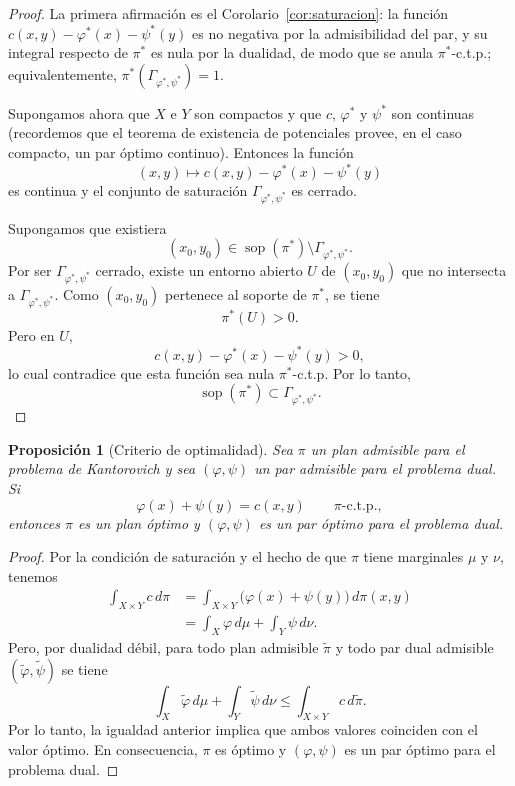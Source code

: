 \documentclass[12pt, a4paper]{amsbook}
\newtheorem{prop}[teo]{Proposición}
\theoremstyle{remark}
\theoremstyle{definition}
\numberwithin{section}{chapter}
\numberwithin{subsection}{section}
\numberwithin{equation}{section}
\numberwithin{figure}{chapter}
\begin{document}
\begin{proof}
La primera afirmación es el Corolario~\ref{cor:saturacion}: la función
$c(x,y)-\varphi^*(x)-\psi^*(y)$ es no negativa por la admisibilidad del par,
y su integral respecto de $\pi^*$ es nula por la dualidad, de modo que se
anula $\pi^*$-c.t.p.; equivalentemente, $\pi^*(\Gamma_{\varphi^*,\psi^*})=1$.

Supongamos ahora que $X$ e $Y$ son compactos y que $c$, $\varphi^*$ y
$\psi^*$ son continuas (recordemos que el teorema de existencia de potenciales
provee, en el caso compacto, un par óptimo continuo). Entonces la función
\[
(x,y)\longmapsto
c(x,y)-\varphi^*(x)-\psi^*(y)
\]
es continua y el conjunto de saturación
$\Gamma_{\varphi^*,\psi^*}$ es cerrado.

Supongamos que existiera
\[
(x_0,y_0)\in\operatorname{sop}(\pi^*)
\setminus
\Gamma_{\varphi^*,\psi^*}.
\]
Por ser $\Gamma_{\varphi^*,\psi^*}$ cerrado, existe un entorno abierto
$U$ de $(x_0,y_0)$ que no intersecta a
$\Gamma_{\varphi^*,\psi^*}$. Como $(x_0,y_0)$ pertenece al soporte de
$\pi^*$, se tiene
\[
\pi^*(U)>0.
\]
Pero en $U$,
\[
c(x,y)-\varphi^*(x)-\psi^*(y)>0,
\]
lo cual contradice que esta función sea nula $\pi^*$-c.t.p. Por lo tanto,
\[
\operatorname{sop}(\pi^*)
\subset
\Gamma_{\varphi^*,\psi^*}.
\]
\end{proof}

\begin{prop}[Criterio de optimalidad]\label{prop.criterio.optimalidad}
Sea $\pi$ un plan admisible para el problema de Kantorovich y sea
$(\varphi,\psi)$ un par admisible para el problema dual. Si
\[
\varphi(x)+\psi(y)=c(x,y)
\qquad
\pi\text{-c.t.p.},
\]
entonces $\pi$ es un plan óptimo y $(\varphi,\psi)$ es un par óptimo para
el problema dual.
\end{prop}

\begin{proof}
Por la condición de saturación y el hecho de que $\pi$ tiene marginales
$\mu$ y $\nu$, tenemos
\[
\begin{aligned}
\int_{X\times Y}c\,d\pi
&=
\int_{X\times Y}
\bigl(\varphi(x)+\psi(y)\bigr)\,d\pi(x,y)\\
&=
\int_X\varphi\,d\mu
+
\int_Y\psi\,d\nu.
\end{aligned}
\]
Pero, por dualidad débil, para todo plan admisible $\widetilde\pi$ y todo
par dual admisible $(\widetilde\varphi,\widetilde\psi)$ se tiene
\[
\int_X\widetilde\varphi\,d\mu
+
\int_Y\widetilde\psi\,d\nu
\leq
\int_{X\times Y}c\,d\widetilde\pi.
\]
Por lo tanto, la igualdad anterior implica que ambos valores coinciden
con el valor óptimo. En consecuencia, $\pi$ es óptimo y
$(\varphi,\psi)$ es un par óptimo para el problema dual.
\end{proof}
\end{document}
